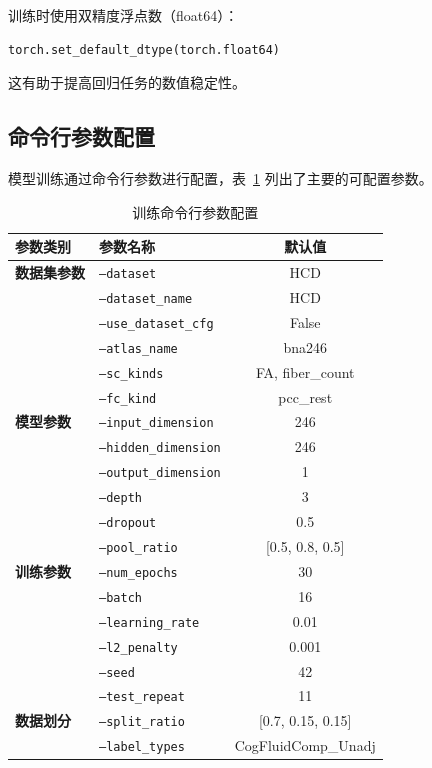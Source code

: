 \documentclass[UTF8, a4paper, 12pt]{article}
\begin{document}
训练时使用双精度浮点数（float64）：
\begin{verbatim}
torch.set_default_dtype(torch.float64)
\end{verbatim}

这有助于提高回归任务的数值稳定性。

\subsection{命令行参数配置}

模型训练通过命令行参数进行配置，表~\ref{tab:cmd_params} 列出了主要的可配置参数。

\begin{table}[htbp]
\centering
\caption{训练命令行参数配置}
\label{tab:cmd_params}
\begin{tabular}{llc}
\toprule
参数类别 & 参数名称 & 默认值 \\
\midrule
\midrule
\textbf{数据集参数} & \texttt{--dataset} & HCD \\
 & \texttt{--dataset\_name} & HCD \\
 & \texttt{--use\_dataset\_cfg} & False \\
 & \texttt{--atlas\_name} & bna246 \\
 & \texttt{--sc\_kinds} & FA, fiber\_count \\
 & \texttt{--fc\_kind} & pcc\_rest \\
\midrule
\textbf{模型参数} & \texttt{--input\_dimension} & 246 \\
 & \texttt{--hidden\_dimension} & 246 \\
 & \texttt{--output\_dimension} & 1 \\
 & \texttt{--depth} & 3 \\
 & \texttt{--dropout} & 0.5 \\
 & \texttt{--pool\_ratio} & [0.5, 0.8, 0.5] \\
\midrule
\textbf{训练参数} & \texttt{--num\_epochs} & 30 \\
 & \texttt{--batch} & 16 \\
 & \texttt{--learning\_rate} & 0.01 \\
 & \texttt{--l2\_penalty} & 0.001 \\
 & \texttt{--seed} & 42 \\
 & \texttt{--test\_repeat} & 11 \\
\midrule
\textbf{数据划分} & \texttt{--split\_ratio} & [0.7, 0.15, 0.15] \\
 & \texttt{--label\_types} & CogFluidComp\_Unadj \\
\midrule

\end{tabular}
\end{table}
\end{document}
